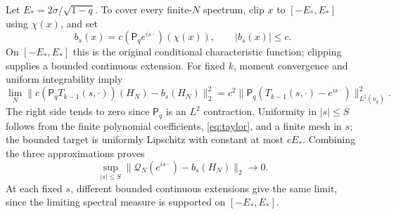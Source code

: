 \documentclass[11pt,a4paper]{article}
\newcommand{\Mq}{\mathsf P_q}
\begin{document}
Let $E_*=2\sigma/\sqrt{1-q}$. To cover every finite-$N$ spectrum,
clip $x$ to $[-E_*,E_*]$ using $\chi(x)$, and set
\begin{equation}
 b_s(x)=c(\Mq e^{is\cdot})(\chi(x)),\qquad |b_s(x)|\le c.
 \label{eq:bs}
\end{equation}
On $[-E_*,E_*]$ this is the original conditional characteristic
function; clipping supplies a bounded continuous extension.
For fixed $k$, moment convergence and uniform integrability imply
\begin{equation}
 \lim_N\|c(\Mq T_{k-1}(s,\cdot))(H_N)-b_s(H_N)\|_2^2
 =c^2\|\Mq(T_{k-1}(s,\cdot)-e^{is\cdot})\|_{L^2(\nu_q)}^2.
\end{equation}
The right side tends to zero since $\Mq$ is an $L^2$ contraction.
Uniformity in $|s|\le S$ follows from the finite polynomial
coefficients, \eqref{eq:taylor}, and a finite mesh in $s$; the bounded
target is uniformly Lipschitz with constant at most $cE_*$.
Combining the three approximations proves
\begin{equation}
 \sup_{|s|\le S}\|\mathcal Q_N(e^{is\cdot})-b_s(H_N)\|_2\to0.
 \label{eq:qtime}
\end{equation}
At each fixed $s$, different bounded continuous extensions give the same limit, since
the limiting spectral measure is supported on $[-E_*,E_*]$.

\newpage
\end{document}
